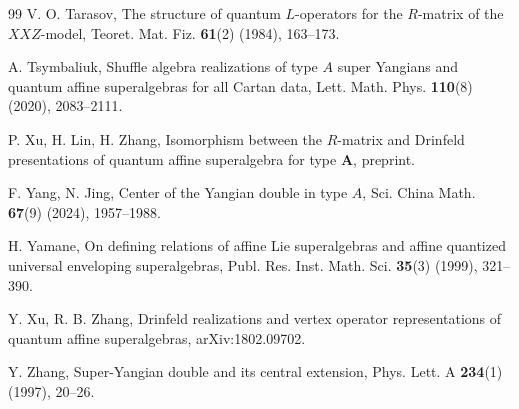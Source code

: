 \documentclass[a4paper,12pt]{article}
\numberwithin{equation}{section}
\begin{document}
\begin{thebibliography}{99}
V. O. Tarasov, The structure of quantum $L$-operators for the $R$-matrix of the $XXZ$-model, Teoret. Mat. Fiz. \textbf{61}(2) (1984), 163--173.

A. Tsymbaliuk, Shuffle algebra realizations of type $A$ super Yangians and quantum affine superalgebras for all Cartan data, Lett. Math. Phys. \textbf{110}(8) (2020), 2083--2111.

P. Xu, H. Lin, H. Zhang, Isomorphism between the $R$-matrix and Drinfeld presentations of quantum affine superalgebra for type $\boldsymbol{A}$, preprint.

F. Yang, N. Jing, Center of the Yangian double in type $A$, Sci. China Math. \textbf{67}(9) (2024), 1957--1988.

H. Yamane, On defining relations of affine Lie superalgebras and affine quantized universal enveloping superalgebras, Publ. Res. Inst. Math.
 Sci. \textbf{35}(3) (1999), 321--390.
 
Y. Xu, R. B. Zhang, Drinfeld realizations and vertex operator representations of quantum affine superalgebras, arXiv:1802.09702.

Y. Zhang, Super-Yangian double and its central extension, Phys. Lett. A \textbf{234}(1) (1997), 20--26.
\end{thebibliography}
\end{document}
